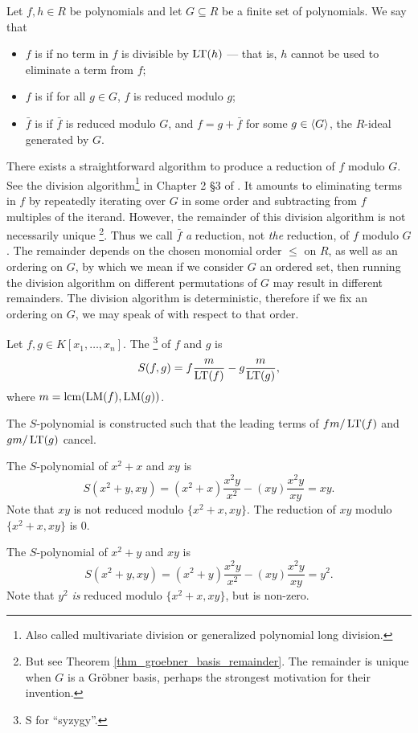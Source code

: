 \begin{definition}
  \label{def_reduced_polynomial}
  Let $f, h \in R$ be polynomials and let $G \subseteq R$ be a finite set of polynomials.
  We say that
  \begin{itemize}
    \item $f$ is  if no term in $f$ is divisible by $\operatorname{LT}(h)$ ---
          that is, $h$ cannot be used to eliminate a term from $f$;
    \item $f$ is  if for all $g \in G$, $f$ is reduced modulo $g$;
    \item $\bar f$ is  if $\bar f$ is reduced modulo $G$,
          and $f = g + \bar f$ for some $g \in \left\langle G \right\rangle$, the $R$-ideal generated by $G$.
  \end{itemize}
\end{definition}
There exists a straightforward algorithm to produce a reduction of $f$ modulo $G$.
See the division algorithm\footnote{Also called multivariate division or generalized polynomial long division.}
in Chapter 2 \S3 of \cite{cox07}.
It amounts to eliminating terms in $f$ by repeatedly iterating over $G$ in some order
and subtracting from $f$ multiples of the iterand.
However, the remainder of this division algorithm is not necessarily unique
\footnote{But see Theorem \ref{thm_groebner_basis_remainder}.
The remainder is unique when $G$ is a Gr\"obner basis, perhaps the strongest motivation for their invention.}.
Thus we call $\bar f$ \emph{a} reduction, not \emph{the} reduction, of $f$ modulo $G$.
The remainder depends on the chosen monomial order $\leq$ on $R$, as well as an ordering on $G$,
by which we mean if we consider $G$ an ordered set, then running the division algorithm on different permutations of $G$
may result in different remainders.
The division algorithm is deterministic, therefore if we fix an ordering on $G$, we may speak of  with respect to that order.

\begin{definition}
  Let $f, g \in K[x_1, \ldots, x_n]$. The \footnote{S for ``syzygy''.} of $f$ and $g$ is
  \[ S(f,g) = f \frac m {\operatorname{LT}(f)} - g \frac m {\operatorname{LT}(g)}, \]
  where $m = \operatorname{lcm}(\operatorname{LM}(f), \operatorname{LM}(g))$.
\end{definition}

The $S$-polynomial is constructed such that the leading terms of $f m / \operatorname{LT}(f)$ and $g m / \operatorname{LT}(g)$ cancel.

\begin{example}
  \label{ex_groebner_2b}
  The $S$-polynomial of $x^2 + x$ and $xy$ is
  \[ S(x^2 + y, xy) = (x^2 + x) \frac{x^2y}{x^2} - (xy)\frac{x^2y}{xy} = xy. \]
  Note that $xy$ is not reduced modulo $\{x^2 + x, xy\}$.
  The reduction of $xy$ modulo $\{x^2 + x, xy\}$ is 0.
\end{example}
\begin{example}
  \label{ex_groebner_3b}
  The $S$-polynomial of $x^2 + y$ and $xy$ is
  \[ S(x^2 + y, xy) = (x^2 + y) \frac{x^2y}{x^2} - (xy)\frac{x^2y}{xy} = y^2. \]
  Note that $y^2$ \emph{is} reduced modulo $\{x^2 + x, xy\}$, but is non-zero.
\end{example}

